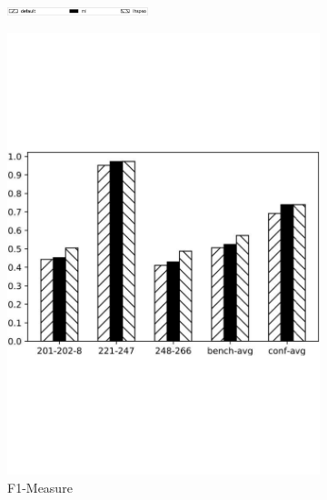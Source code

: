 \documentclass[twoside]{article}
\begin{document}
\begin{figure}[htb!]\centering
\begin{subfigure}{\textwidth}
	\centering
\includegraphics[width=0.45\textwidth]{figures/t_legend.pdf}
\end{subfigure}
\begin{subfigure}{0.3\textwidth}
	\centering
\includegraphics[width=\textwidth]{data_figs/MulRegress_XMap_F1.pdf}
\caption{F1-Measure}
\label{fig:MultiRegress_XMap_F1}
\end{subfigure}
\begin{subfigure}{0.3\textwidth}
	\centering

\end{subfigure}
\end{figure}
\end{document}
